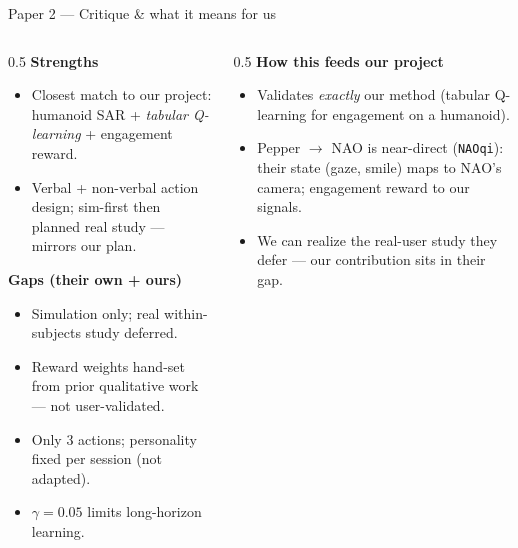 \documentclass[aspectratio=169,10pt]{beamer}
\begin{document}
\begin{frame}{Paper 2 --- Critique \& what it means for us}
  \begin{columns}[T]
    \begin{column}{0.5\textwidth}
      \textbf{Strengths}
      \begin{itemize}\footnotesize
        \item \alert{Closest match to our project}: humanoid SAR + \emph{tabular Q-learning} + engagement reward.
        \item Verbal + non-verbal action design; sim-first then planned real study --- mirrors our plan.
      \end{itemize}
      \textbf{Gaps (their own + ours)}
      \begin{itemize}\footnotesize
        \item \alert{Simulation only}; real within-subjects study deferred.
        \item Reward weights hand-set from prior qualitative work --- not user-validated.
        \item Only 3 actions; personality fixed per session (not adapted).
        \item $\gamma=0.05$ limits long-horizon learning.
      \end{itemize}
    \end{column}
    \begin{column}{0.5\textwidth}
      \textbf{How this feeds our project}
      \begin{itemize}\footnotesize
        \item Validates \emph{exactly} our method (tabular Q-learning for engagement on a humanoid).
        \item Pepper $\to$ NAO is near-direct (\texttt{NAOqi}): their state (gaze, smile) maps to NAO's camera; engagement reward to our signals.
        \item We can \alert{realize the real-user study they defer} --- our contribution sits in their gap.
      \end{itemize}
    \end{column}
  \end{columns}
\end{frame}
\end{document}

